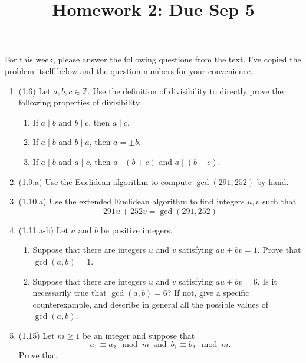 \documentclass[12pt]{amsart}
\theoremstyle{definition}
\begin{document}
\title{Homework 2: Due Sep 5}

\maketitle

For this week, please answer the following questions from the text. 
I've copied the problem itself below and the question numbers for 
your convenience. 

\begin{enumerate}
	\item (1.6) Let $a,b,c \in \mathbb{Z}$. Use the definition of divisibility to directly prove
		the following properties of divisibility.
		\begin{enumerate}
			\item If $a \mid b$ and $b \mid c$, then $a \mid c$. 
			\item If $a \mid b$ and $b \mid a$, then $a = \pm b$.
			\item If $a \mid b$ and $a \mid c$, then $a \mid (b+c)$ and $a \mid (b-c)$.
		\end{enumerate}
	\item (1.9.a) Use the Euclidean algorithm to compute $\operatorname{gcd}(291,252)$ by hand. 
	\item (1.10.a) Use the extended Euclidean algorithm to find integers $u,v$ such that 
		\begin{displaymath}
			291u + 252v = \operatorname{gcd}(291,252)
		\end{displaymath}
	\item (1.11.a-b) Let $a$ and $b$ be positive integers. 
		\begin{enumerate}
			\item Suppose that there are integers $u$ and $v$ satisfying $au + bv = 1$. Prove 
			that $\operatorname{gcd}(a,b) = 1$. 
			\item Suppose that there are integers $u$ and $v$ satisfying $au + bv = 6$. Is 
				it necessarily true that $\operatorname{gcd}(a,b) = 6$? If not, give a 
				specific counterexample, and describe in general all the possible values 
				of $\operatorname{gcd}(a,b)$. 
		\end{enumerate}
	\item (1.15) Let $m \geq 1$ be an integer and suppose that 
		\begin{displaymath}
			a_1 \equiv a_2 \mod m \ \operatorname{and} \ b_1 \equiv b_2 \mod m.
		\end{displaymath}
		Prove that 
		\begin{displaymath}

\end{displaymath}
\end{enumerate}
\end{document}
